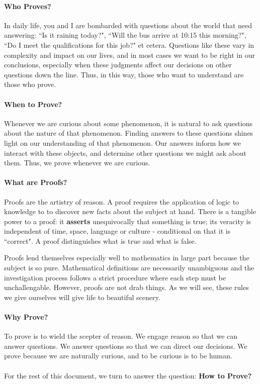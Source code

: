 \documentclass[../proofs.tex]{subfiles}
\begin{document}
\paragraph{Who Proves?} In daily life, you and I are bombarded with questions
about the world that need answering: ``Is it raining today?", ``Will the bus
arrive at 10:15 this morning?", ``Do I meet the qualifications for this job?"
et cetera. Questions like these vary in complexity and impact on our lives,
and in most cases we want to be right in our conclusions, especially when these
judgments affect our decisions on other questions down the line. Thus, in this
way, those who want to understand are those who prove.

\paragraph{When to Prove?} Whenever we are curious about some phenomenon,
it is natural to ask questions about the nature of that phenomenon. Finding
answers to these questions shines light on our understanding of that phenomenon.
Our answers inform how we interact with these objects, and determine other
questions we might ask about them. Thus, we prove whenever we are curious.

\paragraph{What are Proofs?} Proofs are the artistry of reason. A proof
requires the application of logic to knowledge to to discover new facts about
the subject at hand. There is a tangible power to a proof: it \textbf{asserts}
unequivocally that something is true; its veracity is independent of time,
space, language or culture - conditional on that it is ``correct". A
proof distinguishes what is true and what is false.


Proofs lend themselves especially well to mathematics in large part because the
subject is so pure. Mathematical definitions are necessarily unambiguous and the
investigation process follows a strict procedure where each step must be
unchallengable. However, proofs are not drab things. As we will see, these
rules we give ourselves will give life to beautiful scenery.

\paragraph{Why Prove?} To prove is to wield the scepter of reason. We engage
reason so that we can answer questions. We answer questions so that we can
direct our decisions. We prove because we are naturally curious, and to be
curious is to be human.


\paragraph{} For the rest of this document, we turn to answer the question:
\textbf{How to Prove?}
\end{document}
